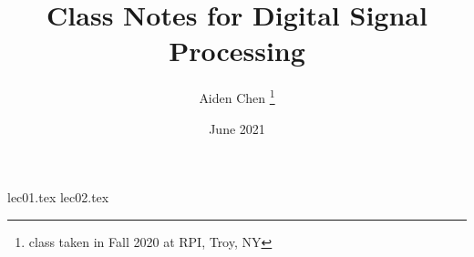 \documentclass[12pt, letterpaper]{article}
\title{Class Notes for Digital Signal Processing}
\author{Aiden Chen \thanks{class taken in Fall 2020 at RPI, Troy, NY}}
\date{June 2021}
\begin{document}
\begin{titlepage}
    \maketitle
\end{titlepage}

{lec01.tex}
\newpage
{lec02.tex}
\end{document}
